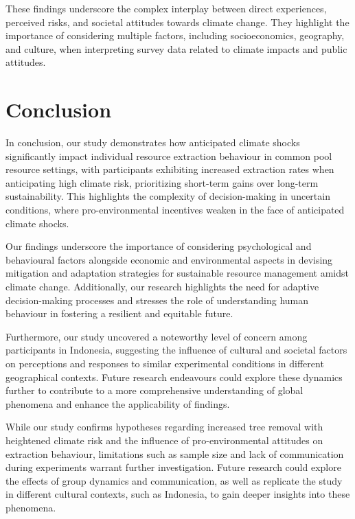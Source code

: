 \documentclass[11pt, a4paper, leqno]{article}
\begin{document}
\noindent These findings underscore the complex interplay between direct experiences, perceived risks, and societal attitudes towards climate change. They highlight the importance of considering multiple factors, including socioeconomics, geography, and culture, when interpreting survey data related to climate impacts and public attitudes.

 

\section{Conclusion} %
\label{sec:Conclusion}
In conclusion, our study demonstrates how anticipated climate shocks significantly impact individual resource extraction behaviour in common pool resource settings, with participants exhibiting increased extraction rates when anticipating high climate risk, prioritizing short-term gains over long-term sustainability. This highlights the complexity of decision-making in uncertain conditions, where pro-environmental incentives weaken in the face of anticipated climate shocks.

Our findings underscore the importance of considering psychological and behavioural factors alongside economic and environmental aspects in devising mitigation and adaptation strategies for sustainable resource management amidst climate change. Additionally, our research highlights the need for adaptive decision-making processes and stresses the role of understanding human behaviour in fostering a resilient and equitable future.

Furthermore, our study uncovered a noteworthy level of concern among participants in Indonesia, suggesting the influence of cultural and societal factors on perceptions and responses to similar experimental conditions in different geographical contexts. Future research endeavours could explore these dynamics further to contribute to a more comprehensive understanding of global phenomena and enhance the applicability of findings.

While our study confirms hypotheses regarding increased tree removal with heightened climate risk and the influence of pro-environmental attitudes on extraction behaviour, limitations such as sample size and lack of communication during experiments warrant further investigation. Future research could explore the effects of group dynamics and communication, as well as replicate the study in different cultural contexts, such as Indonesia, to gain deeper insights into these phenomena.

\clearpage
\clearpage
{}
\nocite{*}
\end{document}
